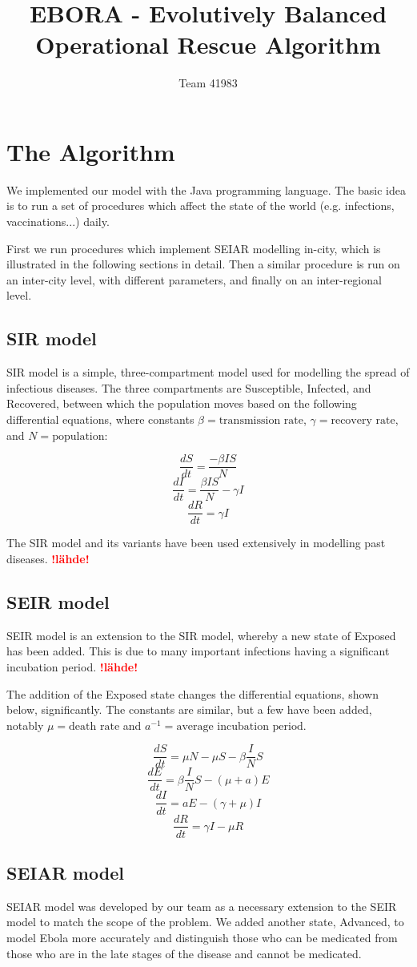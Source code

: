 \documentclass[12pt]{article}
\title{EBORA - Evolutively Balanced Operational Rescue Algorithm}
\author{Team 41983}
\date{}                                           %
\newcommand{\NB}[0]{\textcolor{red}{\textbf{!lähde!}}}
\begin{document}
\setlength{\parindent}{0cm}

\section{The Algorithm}

We implemented our model with the Java programming language. The basic idea is to run a set of procedures which affect the state of the world (e.g. infections, vaccinations...) daily.

First we run procedures which implement SEIAR modelling in-city, which is illustrated in the following sections in detail. Then a similar procedure is run on an inter-city level, with different parameters, and finally on an inter-regional level.

\subsection{SIR model}

SIR model is a simple, three-compartment model used for modelling the spread of infectious diseases. The three compartments are Susceptible, Infected, and Recovered, between which the population moves based on the following differential equations, where constants $\beta = \text{transmission rate}$, $\gamma = \text{recovery rate}$, and $N = \text{population}$:

$$\frac{dS}{dt} = \frac{-\beta I S}{N}$$
$$\frac{dI}{dt} = \frac{\beta I S}{N} - \gamma I$$
$$\frac{dR}{dt} = \gamma I$$

The SIR model and its variants have been used extensively in modelling past diseases. \NB

\subsection{SEIR model}

SEIR model is an extension to the SIR model, whereby a new state of Exposed has been added. This is due to many important infections having a significant incubation period. \NB

The addition of the Exposed state changes the differential equations, shown below, significantly. The constants are similar, but a few have been added, notably $\mu = \text{death rate}$ and $a^{-1} = \text{average incubation period}$.

$$\frac{dS}{dt} = \mu N - \mu S - \beta \frac{I}{N} S$$
$$\frac{dE}{dt} = \beta \frac{I}{N} S - (\mu + a) E$$
$$\frac{dI}{dt} = a E - (\gamma +\mu ) I$$
$$\frac{dR}{dt} = \gamma I  - \mu R$$

\subsection{SEIAR model}

SEIAR model was developed by our team as a necessary extension to the SEIR model to match the scope of the problem. We added another state, Advanced, to model Ebola more accurately and distinguish those who can be medicated from those who are in the late stages of the disease and cannot be medicated.
\end{document}
